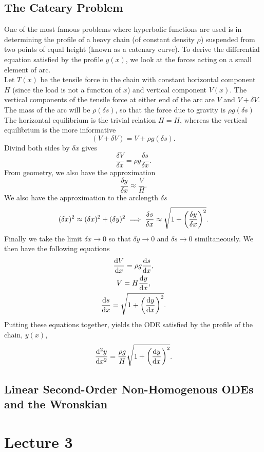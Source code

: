 \documentclass{report}
\begin{document}
\subsection{The Cateary Problem}
One of the most famous problems where hyperbolic functions are used is in determining the profile of a heavy chain (of constant density $\rho$) suspended from two points of equal height (known as a catenary curve). To derive the differential equation satisfied by the profile $y(x)$, we look at the forces acting on a small element of arc. \\
Let $T(x)$ be the tensile force in the chain with constant horizontal component $H$ (since the load is not a function of $x$) and vertical component $V(x)$. The vertical components of the tensile force at either end of the arc are $V$ and $V + \delta V$. The mass of the arc will be $\rho(\delta s)$, so that the force due to gravity is $\rho g(\delta s)$ The horizontal equilibrium is the trivial relation $H = H$, whereas the vertical equilibrium is the more informative
$$
  (V + \delta V) = V + \rho g(\delta s).
$$
Divind both sides by $\delta x$ gives
$$
  \frac{\delta V}{\delta x} = \rho g\frac{\delta s}{\delta x}.
$$
From geometry, we also have the approximation
$$
  \frac{\delta y}{\delta x} \approx \frac{V}{H}.
$$
We also have the approximation to the arclength $\delta s$
$$
  (\delta x)^2 \approx (\delta x)^2 + (\delta y)^2 \implies \frac{\delta s}{\delta x} \approx \sqrt{1+\bracks{\frac{\delta y}{\delta x}}^2}.
$$
Finally we take the limit $\delta x\to 0$ so that $\delta y\to 0$ and $\delta s\to 0$ similtaneously. We then have the following equations
\begin{gather*}
  \dyd[V]{x} = \rho g\dyd[s]{x}, \\
  V = H\dydx, \\
  \dyd[s]{x} = \sqrt{1 + \bracks{\dydx}^2}.
\end{gather*}
Putting these equations together, yields the ODE satisfied by the profile of the chain, $y(x)$,
$$
  \dydxsq = \frac{\rho g}{H}\sqrt{1 + \bracks{\dydx}^2  }.
$$

\subsection{Linear Second-Order Non-Homogenous ODEs and the Wronskian}


\section{Lecture 3}
\end{document}
